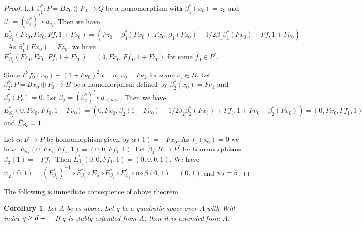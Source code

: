 \documentclass[11pt,a4paper]{amsart}
\theoremstyle{plain}
\newtheorem{cor}[thm]{Corollary}
\theoremstyle{definition}
\theoremstyle{remark}
\begin{document}
\begin{proof}
  Let $\beta_1^*:P=Bx_0\oplus P_0\rightarrow Q$ be a homomorphism with $\beta_1^*(x_0)=z_0$ and $\beta_1=(\beta_1^*)^t\circ d_{q_0}$. Then we have 
  $E_{\beta_1}^*(Fz_0,Fx_0,Ff, 1+F\nu_0)=(Fz_0-\beta_1^*(Fx_0),Fx_0, \beta_1(Fz_0)-1/2\beta_1\beta_1^*(Fx_0)+Ff,1+F\nu_0)$. As $\beta_1^*(Fx_0)=Fz_0$, we have $E_{\beta_1}^*(Fz_0,Fx_0,Ff, 1+F\nu_0)=(0,Fx_0, Ff_0,1+F\nu_0)$ for some $f_0\in P^*$. 
  
  Since $F^2f_0(x_0)+(1+F\nu_0)^2u=u$, $\nu_0=F\nu_1$ for some $\nu_1\in B$. Let $\beta_2^*:P=Bx_0\oplus P_0\rightarrow B$ be a homomorphism defined by $\beta_2^*(x_0)=F\nu_1$ and $\beta_2^*(P_0)=0$. Let $\beta_2=(\beta_2^*)^t\circ d_{<u>}$. Then we have $E^*_{\beta_2}(0,Fx_0,Ff_0,1+F\nu_0)=(0,Fx_0, \beta_2(1+F\nu_0)-1/2\beta_2\beta_2^*(Fx_0)+Ff_0,1+F\nu_0-\beta_2^*(Fx_0))=(0,Fx_0,Ff_1,1)$ and $\Bar{E}_{\beta_2}=1.$

  Let $\alpha:B\rightarrow P$ be homomorphism given by $\alpha(1)=-Fx_0$. As $f_1(x_0)=0$ we have $E_{\alpha_1}(0,Fx_0,Ff_1,1)=(0,0,Ff_1,1)$. Let $\beta_3:B\rightarrow P^*$ be homomorphisms $\beta_3(1)=-Ff_1$. Then $E_{\beta_3}^*(0,0,Ff_1,1)=(0,0,0,1)$. We have $\psi_2(0,1)=(E_{\beta_2}^*)^{-1}\circ E_{\beta_3}^*\circ E_{\alpha}\circ E_{\beta_2}^* \circ E_{\beta_1}^*\circ \widetilde{\eta} \circ \beta(0,1)=(0,1)$ and $\Bar{\psi}_2=\Bar{\beta}$. 
\end{proof}
The following is immediate consequence of above theorem.
\begin{cor}
    Let $A$ be as above. Let $q$ be a quadratic space over $A$ with Witt index $\Bar{q}\geq d+1$. If $q$ is stably extended from $A$, then it is extended from $A$.
\end{cor}
 
  
\end{document}
